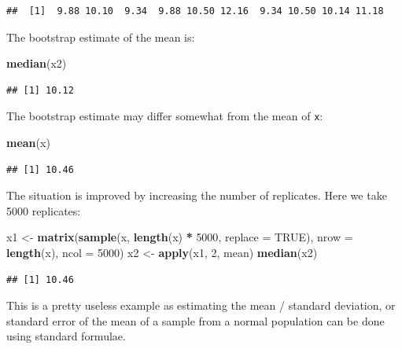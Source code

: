 \documentclass[12pt,a4paper]{book}
\newenvironment{Shaded}{\begin{snugshade}}{\end{snugshade}}
\newcommand{\KeywordTok}[1]{\textcolor[rgb]{0.13,0.29,0.53}{\textbf{#1}}}
\newcommand{\DataTypeTok}[1]{\textcolor[rgb]{0.13,0.29,0.53}{#1}}
\newcommand{\DecValTok}[1]{\textcolor[rgb]{0.00,0.00,0.81}{#1}}
\newcommand{\StringTok}[1]{\textcolor[rgb]{0.31,0.60,0.02}{#1}}
\newcommand{\OtherTok}[1]{\textcolor[rgb]{0.56,0.35,0.01}{#1}}
\newcommand{\OperatorTok}[1]{\textcolor[rgb]{0.81,0.36,0.00}{\textbf{#1}}}
\newcommand{\NormalTok}[1]{#1}
\theoremstyle{definition}
\theoremstyle{definition}
\theoremstyle{definition}
\theoremstyle{remark}
\begin{document}
\begin{verbatim}
##  [1]  9.88 10.10  9.34  9.88 10.50 12.16  9.34 10.50 10.14 11.18
\end{verbatim}

The bootstrap estimate of the mean is:

\begin{Shaded}
\begin{Highlighting}[]
\KeywordTok{median}\NormalTok{(x2)}
\end{Highlighting}
\end{Shaded}

\begin{verbatim}
## [1] 10.12
\end{verbatim}

The bootstrap estimate may differ somewhat from the mean of \texttt{x}:

\begin{Shaded}
\begin{Highlighting}[]
\KeywordTok{mean}\NormalTok{(x)}
\end{Highlighting}
\end{Shaded}

\begin{verbatim}
## [1] 10.46
\end{verbatim}

The situation is improved by increasing the number of replicates. Here
we take 5000 replicates:

\begin{Shaded}
\begin{Highlighting}[]
\NormalTok{x1 <-}\StringTok{ }\KeywordTok{matrix}\NormalTok{(}\KeywordTok{sample}\NormalTok{(x, }\KeywordTok{length}\NormalTok{(x) }\OperatorTok{*}\StringTok{ }\DecValTok{5000}\NormalTok{, }\DataTypeTok{replace =} \OtherTok{TRUE}\NormalTok{),}
             \DataTypeTok{nrow =} \KeywordTok{length}\NormalTok{(x), }\DataTypeTok{ncol =} \DecValTok{5000}\NormalTok{)}
\NormalTok{x2 <-}\StringTok{ }\KeywordTok{apply}\NormalTok{(x1, }\DecValTok{2}\NormalTok{, mean)}
\KeywordTok{median}\NormalTok{(x2)}
\end{Highlighting}
\end{Shaded}

\begin{verbatim}
## [1] 10.46
\end{verbatim}

This is a pretty useless example as estimating the mean / standard
deviation, or standard error of the mean of a sample from a normal
population can be done using standard formulae.
\end{document}
